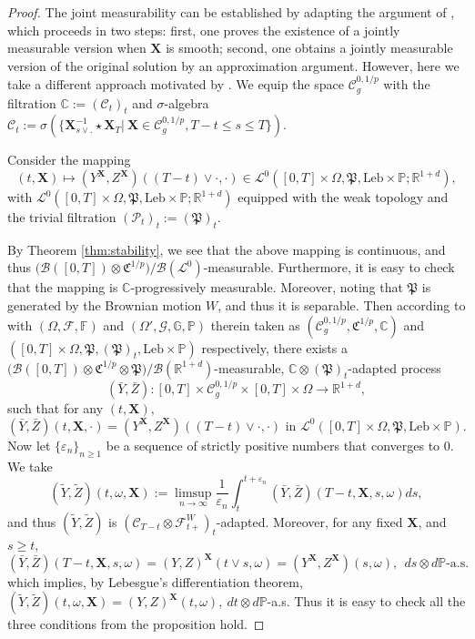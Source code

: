 \documentclass[11pt,reqno]{amsart}
\newcommand{\FP}{{\mathfrak{P}}}
\newcommand{\FC}{{\mathfrak{C}}}
\newcommand{\BX}{{\mathbf{X}}}
\newcommand{\MF}{{\mathcal{F}}}
\numberwithin{equation}{section}
\def\PP{{\mathbb P}}
\def\R{\mathbb R}
\begin{document}
\begin{proof}
The joint measurability can be established by adapting the argument of \cite{FLZ26,BS25}, which proceeds in two steps: first, one proves the existence of a jointly measurable version when \(\BX\) is smooth; second, one obtains a jointly measurable version of the original solution by an approximation argument. However, here we take a different approach motivated by \cite[Theorem~IV.30]{Meyer1978}. We equip the space $\mathscr{C}^{0,1/p}_g$ with the filtration $\mathbb C:=(\mathcal C_t)_t$ and $\sigma$-algebra $\mathcal C_t:=  \sigma(\{\BX_{s \vee . }^{-1}\star \BX_T | \ \BX \in \mathscr{C}^{0,1/p}_g, T-t \le s \le T  \})$.

Consider the mapping $$(t,\BX) \mapsto (Y^{\BX}, Z^{\BX} )((T-t)\vee\cdot, \cdot ) \in \mathcal L^0([0,T] \times \Omega, \FP, \text{Leb} \times \PP ; \R^{1+d}),$$ with $\mathcal L^0([0,T] \times \Omega, \FP, \text{Leb} \times \PP; \R^{1+d})$ equipped with the weak topology and the trivial filtration $( \mathcal P_t)_t:=(\FP)_t$. 

By Theorem \ref{thm:stability}, we see that the above mapping is continuous, and thus $\big(\mathcal B([0,T]) \otimes \FC^{1/p}\big)/ \mathcal B (\mathcal L^0) $-measurable. Furthermore, it is easy to check that the mapping is $\mathbb C$-progressively measurable. Moreover,   noting that $\FP$ is generated by the Brownian motion $W$, and thus it is separable. Then according to \cite[Proposition~3.9]{DKP24} with  $(\Omega, \mathcal F, \mathbb F) $ and  $(\Omega',  \mathcal G, \mathbb G, \PP)$ therein taken as $(\mathscr{C}^{0,1/p}_g,  \FC^{1/p}, \mathbb C)$ and $([0,T] \times \Omega, \FP, (\FP)_t, \text{Leb}\times\PP)$ respectively, there exists a $\big(\mathcal B([0,T]) \otimes \FC^{1/p} \otimes  \FP \big) /\mathcal B( \R^{1+d} )$-measurable, $\mathbb C \otimes (\FP)_t$-adapted process $$(\bar Y, \bar Z):[0,T] \times \mathscr{C}^{0,1/p}_g \times [0,T] \times \Omega \rightarrow   \R^{1+d },$$ such that for any $(t,\BX),$ 
$$
(\bar{Y}, \bar{Z})(t,\BX,\cdot)= (Y^{\BX}, Z^{\BX})((T-t)\vee \cdot, \cdot) \text{ in } \mathcal L^0([0,T]\times \Omega, \FP,  \text{Leb} \times \PP).
$$
Now let $\{\varepsilon_n\}_{n\ge 1}$ be a sequence of strictly positive numbers that converges to $0$. We take 
\begin{equation}
(\tilde Y, \tilde Z)(t,\omega, \BX):= \limsup_{n \to \infty} \frac{1}{\varepsilon_n} \int_{t}^{t+\varepsilon_n} (\bar{Y}, \bar{Z})(T-t, \BX, s, \omega)ds, 
\end{equation}
and thus $(\tilde Y, \tilde Z)$ is $(\mathcal C_{T-t} \otimes \MF^W_{t+})_t$-adapted. Moreover, for any fixed $\BX$, and $s\ge t,$ 
$$
(\bar{Y}, \bar{Z})(T-t, \BX, s, \omega)= (Y,Z)^{\BX}(t\vee s, \omega)= (Y^{\BX},Z^{\BX}) (s,\omega), \ \ ds\otimes d\PP\text{-a.s.}
$$
which implies, by Lebesgue's differentiation theorem, $(\tilde Y, \tilde Z)(t,\omega, \BX)= (Y,Z)^{\BX}(t,\omega), \ dt\otimes d\PP$-a.s. Thus it is easy to check all the three conditions from the proposition hold.
\end{proof}
\end{document}
